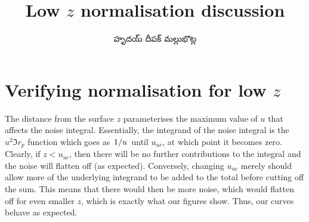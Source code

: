 \documentclass[../main.tex]{subfiles}
\title{Low $z$ normalisation discussion}
\author{\begin{telugu}హృదయ్ దీపక్ మల్లుభొట్ల\end{telugu}}
\date{}
\begin{document}
	\onlyinsubfile{\maketitle}

	\section{Verifying normalisation for low \texorpdfstring{$z$}{z}} \label{sec:lowz:norm}

	The distance from the surface $z$ parameterises the maximum value of $u$ that affects the noise integral.
	Essentially, the integrand of the noise integral is the $u^2 \Im r_p$ function which goes as $\flatfrac{1}{u}$ until $u_{uc}$, at which point it becomes zero.
	Clearly, if $z < u_{uc}$, then there will be no further contributions to the integral and the noise will flatten off (as expected).
	Conversely, changing $u_{uc}$ merely should allow more of the underlying integrand to be added to the total before cutting off the sum.
	This means that there would then be more noise, which would flatten off for even smaller $z$, which is exactly what our figures show.
	Thus, our curves behave as expected.
\end{document}
